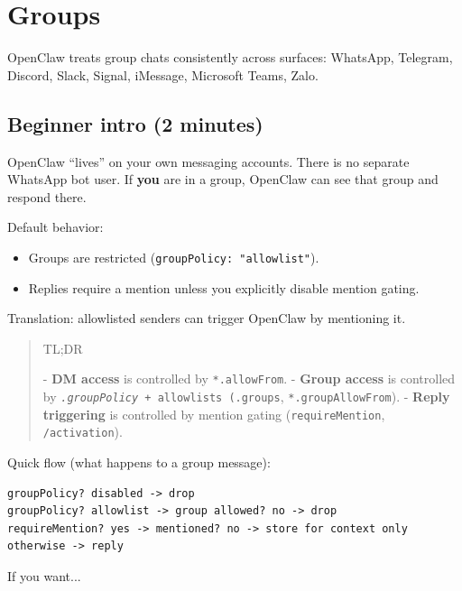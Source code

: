\clearpage

\section{Groups}


OpenClaw treats group chats consistently across surfaces: WhatsApp, Telegram, Discord, Slack, Signal, iMessage, Microsoft Teams, Zalo.

\subsection{Beginner intro (2 minutes)}


OpenClaw “lives” on your own messaging accounts. There is no separate WhatsApp bot user.
If \textbf{you} are in a group, OpenClaw can see that group and respond there.

Default behavior:

\begin{itemize}
  \item Groups are restricted (\texttt{groupPolicy: "allowlist"}).
  \item Replies require a mention unless you explicitly disable mention gating.
\end{itemize}


Translation: allowlisted senders can trigger OpenClaw by mentioning it.

\begin{quote}
TL;DR

- \textbf{DM access} is controlled by \texttt{*.allowFrom}.
- \textbf{Group access} is controlled by \texttt{\textit{.groupPolicy} + allowlists (\texttt{}.groups}, \texttt{*.groupAllowFrom}).
- \textbf{Reply triggering} is controlled by mention gating (\texttt{requireMention}, \texttt{/activation}).
\end{quote}


Quick flow (what happens to a group message):

\begin{lstlisting}
groupPolicy? disabled -> drop
groupPolicy? allowlist -> group allowed? no -> drop
requireMention? yes -> mentioned? no -> store for context only
otherwise -> reply
\end{lstlisting}



If you want...


